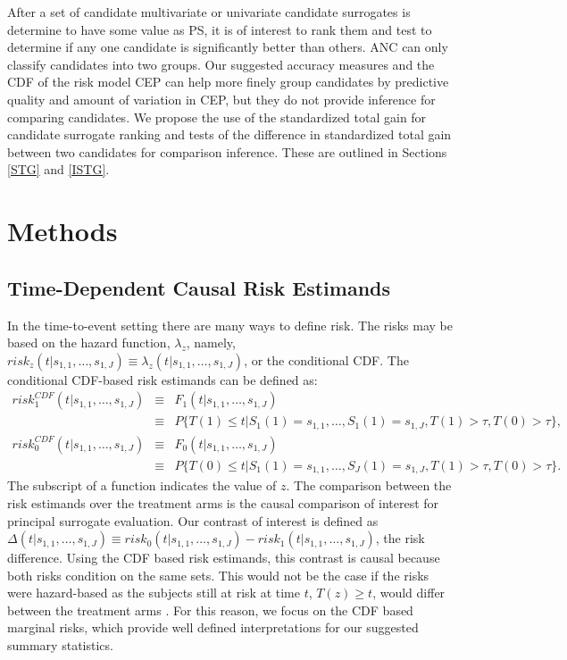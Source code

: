 \documentclass[times, doublespace]{simauth}
\begin{document}
After a set of candidate multivariate or univariate candidate surrogates is determine to have some value as PS, it is of interest to rank them and test to determine if any one candidate is significantly better than others. ANC can only classify candidates into two groups. Our suggested accuracy measures and the CDF of the risk model CEP can help more finely group candidates by predictive quality and amount of variation in CEP, but they do not provide inference for comparing candidates. We propose the use of the standardized total gain for candidate surrogate ranking and tests of the difference in standardized total gain between two candidates for comparison inference. These are outlined in Sections \ref{STG} and \ref{ISTG}. 

\section{Methods}
\subsection{Time-Dependent Causal Risk Estimands} \label{CRE}
In the time-to-event setting there are many ways to define risk. The risks may be based on the hazard function, $\lambda_z$, namely, $risk_{z}(t|s_{1,1},\ldots,s_{1,J})\equiv\lambda_z(t|s_{1,1},\ldots,s_{1,J})$, or the conditional CDF. The conditional CDF-based risk estimands can be defined as:
\begin{eqnarray*}
risk_{1}^{CDF}(t|s_{1,1}, \ldots, s_{1,J}) &\equiv& F_1(t|s_{1,1}, \ldots, s_{1,J})\\
&\equiv& P\{T(1) \leq t|S_{1}(1)=s_{1,1},\ldots, S_{1}(1)=s_{1,J},T(1)> \tau, T(0)> \tau\},\\
risk_{0}^{CDF}(t|s_{1,1}, \ldots, s_{1,J}) &\equiv& F_0(t|s_{1,1}, \ldots, s_{1,J}) \\
&\equiv& P\{T(0) \leq t|S_{1}(1)=s_{1,1},\ldots, S_{J}(1)=s_{1,J},T(1)>\tau, T(0)>\tau\}.
\end{eqnarray*}
The subscript of a function indicates the value of $z$. The comparison between the risk estimands over the treatment arms is the causal comparison of interest for principal surrogate evaluation. Our contrast of interest is defined as $\Delta(t|s_{1,1}, \dots, s_{1,J}) \equiv risk_0(t|s_{1,1}, \ldots, s_{1,J})-risk_1(t|s_{1,1}, \ldots, s_{1,J})$, the risk difference. Using the CDF based risk estimands, this contrast is causal because both risks condition on the same sets. This would not be the case if the risks were hazard-based as the subjects still at risk at time $t$, $T(z)\geq t$, would differ between the treatment arms \citep{Hernan10, Gabriel13}. For this reason, we focus on the CDF based marginal risks, which provide well defined  interpretations for our suggested summary statistics.
\end{document}
